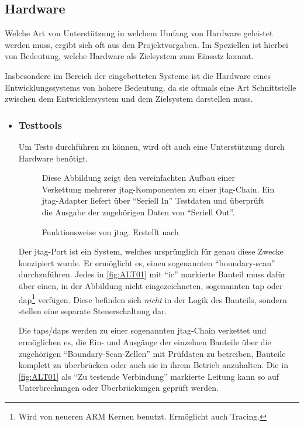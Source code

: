 \subsection{Hardware}\label{sub:hardware}
Welche Art von Unterstützung in welchem Umfang von Hardware geleistet werden
muss, ergibt sich oft aus den Projektvorgaben. Im Speziellen ist hierbei von
Bedeutung, welche Hardware als Zielsystem zum Einsatz kommt.

Insbesondere im Bereich der eingebetteten Systeme ist die Hardware eines
Entwicklungssystems von hohere Bedeutung, da sie oftmals eine Art Schnittstelle
zwischen dem Entwicklersystem und dem Zielsystem darstellen muss.
\begin{itemize}
  \item \subsubsection*{Testtools} Um Tests durchführen zu können, wird
  oft auch eine Unterstützung durch Hardware benötigt. 
  \begin{figure}[!ht]
    \centering
    \def\svgwidth{\columnwidth}
    
    \caption{Funktionsweise von \gls{jtag}. Erstellt nach \cite{ALT01}}{Diese
    Abbildung zeigt den vereinfachten Aufbau einer Verkettung
    mehrerer \gls{jtag}-Komponenten zu einer \gls{jtag}-Chain. Ein
    \gls{jtag}-Adapter liefert über "`Seriell In"' Testdaten und überprüft die
    Ausgabe der zugehörigen Daten von "`Seriell Out"'. }
    \label{fig:ALT01}
  \end{figure}
  Der \gls{jtag}-Port ist ein System, welches ursprünglich für genau diese
  Zwecke konzipiert wurde. Er ermöglicht es, einen sogenannten "`boundary-scan"'
  durchzuführen. Jedes in \autoref{fig:ALT01} mit "`\gls{ic}"' markierte
  Bauteil muss dafür über einen, in der Abbildung nicht eingezeichneten, sogenannten \gls{tap} oder
  \gls{dap}\footnote{Wird von neueren ARM Kernen benutzt.
  Ermöglicht auch Tracing.} verfügen. Diese befinden sich \emph{nicht} in der
  Logik des Bauteils, sondern stellen eine separate Steuerschaltung dar.
  
  Die \glspl{tap}/\glspl{dap} werden zu einer sogenannten
  \gls{jtag}-Chain verkettet und ermöglichen es, die Ein- und Ausgänge der
  einzelnen Bauteile über die zugehörigen "`Boundary-Scan-Zellen"' mit Prüfdaten
  zu betreiben, Bauteile komplett zu überbrücken oder auch sie in ihrem Betrieb
  anzuhalten. Die in \autoref{fig:ALT01} als "`Zu testende Verbindung"'
  markierte Leitung kann so auf Unterbrechungen oder Überbrückungen geprüft
  werden.
  

\end{itemize}
